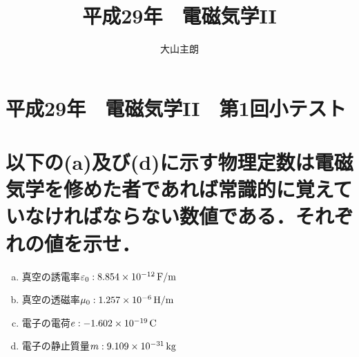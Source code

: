 \documentclass[dvipdfmx]{ujarticle}
\begin{document}
\title{平成29年　電磁気学II}
\date{}
\author{大山主朗}

\maketitle

\section*{平成29年　電磁気学II　第1回小テスト}

\section{以下の(a)及び(d)に示す物理定数は電磁気学を修めた者であれば常識的に覚えていなければならない数値である．それぞれの値を示せ．}
\begin{enumerate}[(a)]
	\item 真空の誘電率$\varepsilon_{0}:8.854 \times 10^{-12}\,\rm{F/m}$
	\item 真空の透磁率$\mu_{0}:1.257 \times 10^{-6}\,\rm{H/m}$
	\item 電子の電荷$e:-1.602 \times 10^{-19}\,\rm{C}$
	\item 電子の静止質量$m:9.109\times 10^{-31}\,\rm{kg}$
\end{enumerate}
\end{document}

